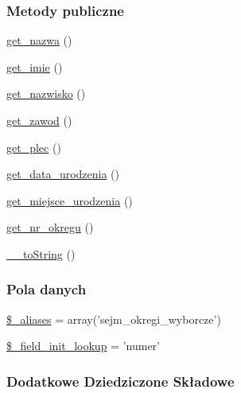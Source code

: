 \subsubsection*{Metody publiczne}
\begin{DoxyCompactItemize}
\item 
\hyperlink{classep___sejm___okreg___wyborczy_ac0818f0049d7b84f08f77128f54cee36}{get\-\_\-nazwa} ()
\item 
\hyperlink{classep___sejm___okreg___wyborczy_ac4b0c85dc2a130038f2d118dbd0c3d77}{get\-\_\-imie} ()
\item 
\hyperlink{classep___sejm___okreg___wyborczy_abdd1d7ff92508da7f748ba1feec97af0}{get\-\_\-nazwisko} ()
\item 
\hyperlink{classep___sejm___okreg___wyborczy_af80ca8310b60004454dd02a387deaa2c}{get\-\_\-zawod} ()
\item 
\hyperlink{classep___sejm___okreg___wyborczy_ac7f9af5c3fa024e4c26a7b6bd4ce4bb4}{get\-\_\-plec} ()
\item 
\hyperlink{classep___sejm___okreg___wyborczy_a880b240cd2d8c336fd1709bf0cb1ae2c}{get\-\_\-data\-\_\-urodzenia} ()
\item 
\hyperlink{classep___sejm___okreg___wyborczy_ac57c08ec5e394a19c5bd9280c8376182}{get\-\_\-miejsce\-\_\-urodzenia} ()
\item 
\hyperlink{classep___sejm___okreg___wyborczy_a2645a9f0aa5b0ccc482943348c033d0a}{get\-\_\-nr\-\_\-okregu} ()
\item 
\hyperlink{classep___sejm___okreg___wyborczy_a7516ca30af0db3cdbf9a7739b48ce91d}{\-\_\-\-\_\-to\-String} ()
\end{DoxyCompactItemize}
\subsubsection*{Pola danych}
\begin{DoxyCompactItemize}
\item 
\hyperlink{classep___sejm___okreg___wyborczy_ab4e31d75f0bc5d512456911e5d01366b}{\$\-\_\-aliases} = array('sejm\-\_\-okregi\-\_\-wyborcze')
\item 
\hyperlink{classep___sejm___okreg___wyborczy_a4a4d54ae35428077a7c61ec8a5139af3}{\$\-\_\-field\-\_\-init\-\_\-lookup} = 'numer'
\end{DoxyCompactItemize}
\subsubsection*{Dodatkowe Dziedziczone Składowe}


